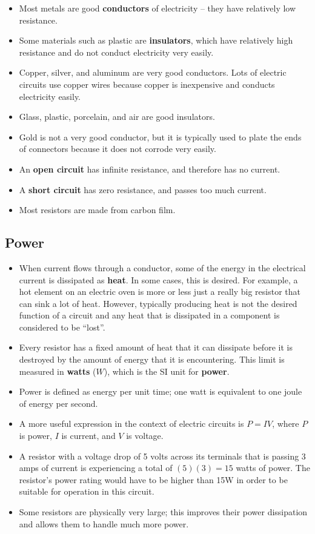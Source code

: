 \documentclass[letterpaper,12pt]{scrartcl}
\begin{document}
\begin{itemize}
\item Most metals are good \textbf{conductors} of electricity -- they have relatively low resistance.
\item Some materials such as plastic are \textbf{insulators}, which have relatively high resistance and do not conduct electricity very easily.
\item Copper, silver, and aluminum are very good conductors. Lots of electric circuits use copper wires because copper is inexpensive and conducts electricity easily.
\item Glass, plastic, porcelain, and air are good insulators.
\item Gold is not a very good conductor, but it is typically used to plate the ends of connectors because it does not corrode very easily.
\item An \textbf{open circuit} has infinite resistance, and therefore has no current.
\item A \textbf{short circuit} has zero resistance, and passes too much current.
\item Most resistors are made from carbon film.
\end{itemize}

\subsection{Power}

\begin{itemize}
\item When current flows through a conductor, some of the energy in the electrical current is dissipated as \textbf{heat}.
In some cases, this is desired. For example, a hot element on an electric oven is more or less just a really big resistor that can sink a lot of heat.
However, typically producing heat is not the desired function of a circuit and any heat that is dissipated in a component is considered to be ``lost''.
\item Every resistor has a fixed amount of heat that it can dissipate before it is destroyed by the amount of energy that it is encountering.
This limit is measured in \textbf{watts} ($W$), which is the SI unit for \textbf{power}.
\item Power is defined as energy per unit time; one watt is equivalent to one joule of energy per second.
\item A more useful expression in the context of electric circuits is $P = IV$, where $P$ is power, $I$ is current, and $V$ is voltage.
\item A resistor with a voltage drop of 5 volts across its terminals that is passing 3 amps of current is experiencing a total of $(5)(3) = 15$ watts of power.
The resistor's power rating would have to be higher than 15W in order to be suitable for operation in this circuit.
\item Some resistors are physically very large; this improves their power dissipation and allows them to handle much more power.
\end{itemize}
\end{document}
